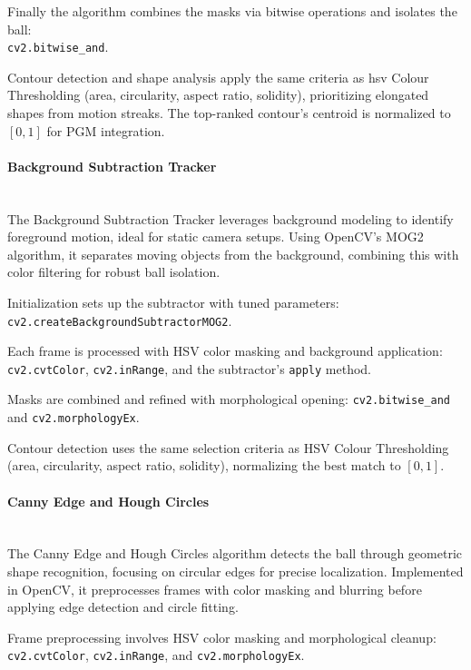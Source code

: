 \documentclass[12pt,a4paper]{article}
\begin{document}
Finally the algorithm combines the masks via bitwise operations and isolates the ball:\\ \texttt{cv2.bitwise\_and}.

Contour detection and shape analysis apply the same criteria as \acs{hsv} Colour Thresholding (area, circularity, aspect ratio, solidity), prioritizing elongated shapes from motion streaks. The top-ranked contour's centroid is normalized to $[0,1]$ for PGM integration. 

\paragraph{Background Subtraction Tracker}
\mbox{}\\
The Background Subtraction Tracker leverages background modeling to identify foreground motion, ideal for static camera setups. Using OpenCV's MOG2 algorithm, it separates moving objects from the background, combining this with color filtering for robust ball isolation.

Initialization sets up the subtractor with tuned parameters:\\ \texttt{cv2.createBackgroundSubtractorMOG2}.

Each frame is processed with HSV color masking and background application: \texttt{cv2.cvtColor}, \texttt{cv2.inRange}, and the subtractor's \texttt{apply} method.

Masks are combined and refined with morphological opening: \texttt{cv2.bitwise\_and} and \texttt{cv2.morphologyEx}.

Contour detection uses the same selection criteria as HSV Colour Thresholding (area, circularity, aspect ratio, solidity), normalizing the best match to $[0,1]$. 

\paragraph{Canny Edge and Hough Circles}
\mbox{}\\

The Canny Edge and Hough Circles algorithm detects the ball through geometric shape recognition, focusing on circular edges for precise localization. Implemented in OpenCV, it preprocesses frames with color masking and blurring before applying edge detection and circle fitting.

Frame preprocessing involves HSV color masking and morphological cleanup: \texttt{cv2.cvtColor}, \texttt{cv2.inRange}, and \texttt{cv2.morphologyEx}.
\end{document}
